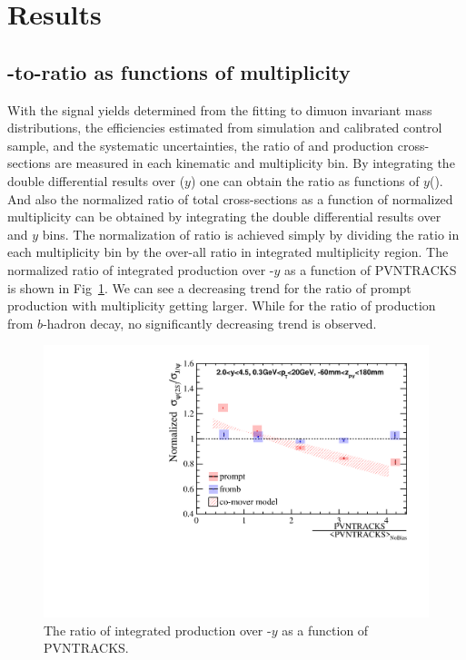 \section{Results}
\label{sec:results}
\subsection{\psitwos-to-\jpsi ratio as functions of multiplicity}
With the signal yields determined from the fitting to dimuon invariant mass distributions, the efficiencies estimated from simulation and calibrated control sample, and the systematic uncertainties, the ratio of \psitwos and \jpsi production cross-sections are measured in each kinematic and multiplicity bin.
By integrating the double differential results over \pt($y$) one can obtain the ratio as functions of $y$(\pt).
And also the normalized ratio of total cross-sections as a function of normalized multiplicity can be obtained by integrating the double differential results over \pt and $y$ bins. The normalization of ratio is achieved simply by dividing the ratio in each multiplicity bin by the over-all ratio in integrated multiplicity region.
The normalized ratio of integrated production over \pt-$y$ as a function of PVNTRACKS is shown in Fig~\ref{Ratio}. We can see a decreasing trend for the ratio of prompt production with multiplicity getting larger. While for the ratio of production from $b$-hadron decay, no significantly decreasing trend is observed. 
\begin{figure}[!tbp]
    \begin{center}
      \includegraphics[width=0.8\linewidth]{pdf/Result/All.pdf}
    \end{center}
    \caption{ The ratio of integrated production over \pt-$y$ as a function of PVNTRACKS.
      }
    \label{Ratio}
\end{figure}

